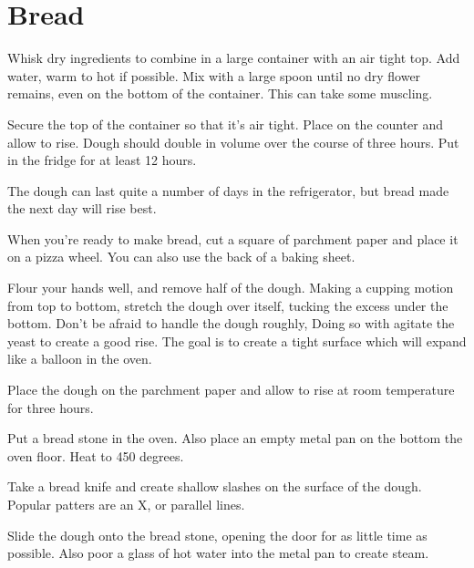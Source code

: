 
\section{Bread}
\begin{recipe}


Whisk dry ingredients to combine in a large container with an air tight top. Add water, warm to hot if possible. Mix with a large spoon until no dry flower remains, even on the bottom of the container. This can take some muscling.

Secure the top of the container so that it's air tight. Place on the counter and allow to rise. Dough should double in volume over the course of three hours. Put in the fridge for at least 12 hours.

The dough can last quite a number of days in the refrigerator, but bread made the next day will rise best.

When you're ready to make bread, cut a square of parchment paper and place it on a pizza wheel. You can also use the back of a baking sheet.

Flour your hands well, and remove half of the dough. Making a cupping motion from top to bottom, stretch the dough over itself, tucking the excess under the bottom. Don't be afraid to handle the dough roughly, Doing so with agitate the yeast to create a good rise. The goal is to create a tight surface which will expand like a balloon in the oven.

Place the dough on the parchment paper and allow to rise at room temperature for three hours.

Put a bread stone in the oven. Also place an empty metal pan on the bottom the oven floor. Heat to 450 degrees.

Take a bread knife and create shallow slashes on the surface of the dough. Popular patters are an X, or parallel lines.

Slide the dough onto the bread stone, opening the door for as little time as possible. Also poor a glass of hot water into the metal pan to create steam.


\end{recipe}
